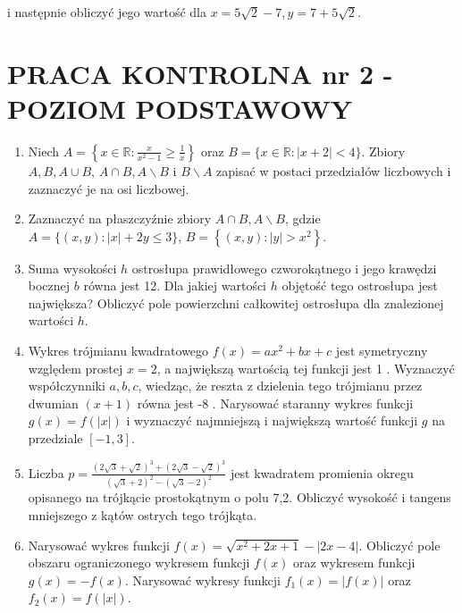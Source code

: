 \documentclass[10pt]{article}
\begin{document}
i następnie obliczyć jego wartość dla $x=5 \sqrt{2}-7, y=7+5 \sqrt{2}$.

\section*{PRACA KONTROLNA nr 2 - POZIOM PODSTAWOWY}
\begin{enumerate}
  \item Niech $A=\left\{x \in \mathbb{R}: \frac{x}{x^{2}-1} \geqslant \frac{1}{x}\right\}$ oraz $B=\{x \in \mathbb{R}:|x+2|<4\}$. Zbiory $A, B, A \cup B$, $A \cap B, A \backslash B$ i $B \backslash A$ zapisać w postaci przedziałów liczbowych i zaznaczyć je na osi liczbowej.
  \item Zaznaczyć na płaszczyźnie zbiory $A \cap B, A \backslash B$, gdzie $A=\{(x, y):|x|+2 y \leqslant 3\}$, $B=\left\{(x, y):|y|>x^{2}\right\}$.
  \item Suma wysokości $h$ ostrosłupa prawidłowego czworokątnego i jego krawędzi bocznej $b$ równa jest 12. Dla jakiej wartości $h$ objętość tego ostrosłupa jest największa? Obliczyć pole powierzchni całkowitej ostrosłupa dla znalezionej wartości $h$.
  \item Wykres trójmianu kwadratowego $f(x)=a x^{2}+b x+c$ jest symetryczny względem prostej $x=2$, a największą wartością tej funkcji jest 1 . Wyznaczyć współczynniki $a, b, c$, wiedząc, że reszta z dzielenia tego trójmianu przez dwumian $(x+1)$ równa jest -8 . Narysować staranny wykres funkcji $g(x)=f(|x|)$ i wyznaczyć najmniejszą i największą wartość funkcji $g$ na przedziale $[-1,3]$.
  \item Liczba $p=\frac{(2 \sqrt{3}+\sqrt{2})^{3}+(2 \sqrt{3}-\sqrt{2})^{3}}{(\sqrt{3}+2)^{2}-(\sqrt{3}-2)^{2}}$ jest kwadratem promienia okregu opisanego na trójkącie prostokątnym o polu 7,2. Obliczyć wysokość i tangens mniejszego z kątów ostrych tego trójkąta.
  \item Narysować wykres funkcji $f(x)=\sqrt{x^{2}+2 x+1}-|2 x-4|$. Obliczyć pole obszaru ograniczonego wykresem funkcji $f(x)$ oraz wykresem funkcji $g(x)=-f(x)$. Narysować wykresy funkcji $f_{1}(x)=|f(x)|$ oraz $f_{2}(x)=f(|x|)$.
\end{enumerate}
\end{document}
